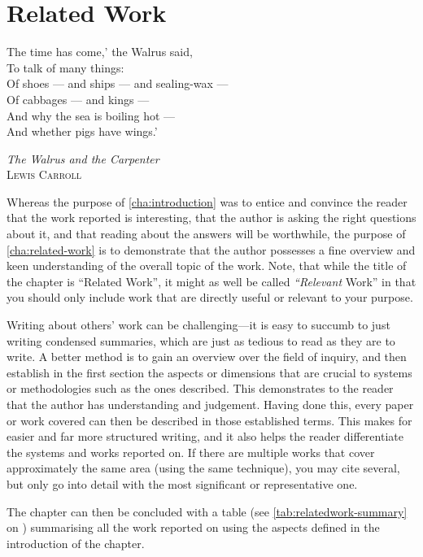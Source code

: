 \chapter{Related Work}
\label{cha:related-work}

\epigraph{%
  The time has come,' the Walrus said,\\
      To talk of many things:\\
Of shoes — and ships — and sealing-wax —\\
      Of cabbages — and kings —\\
And why the sea is boiling hot —\\
      And whether pigs have wings.'}%
  {\textit{The Walrus and the Carpenter}\\ \textsc{Lewis Carroll}}
Whereas the purpose of \autoref{cha:introduction} was to entice and
convince the reader that the work reported is interesting, that the author
is asking the right questions about it, and that reading about the answers will be
worthwhile, the purpose of \autoref{cha:related-work} is to
demonstrate that the author possesses a fine overview and keen
understanding of the overall topic of the work.  Note, that while the title of
the chapter is ``Related Work'', it might as well be called
\emph{``Relevant} Work'' in that you should only include work that are
directly useful or relevant to your purpose. 

Writing about others' work can be challenging---it is easy to succumb to just
writing condensed summaries, which are just as tedious to read as they are to
write.  A better method is to gain an overview over the field of inquiry, and
then establish in the first section the aspects or dimensions that are crucial
to systems or methodologies such as the ones described. This demonstrates to
the reader that the author has understanding and judgement. Having done this,
every paper or work covered can then be described in those established terms. This
makes for easier and far more structured writing, and it also helps the
reader differentiate the systems and works reported on. If there are multiple
works that cover approximately the same area (\eg using the same technique),
you may cite several, but only go into detail with the most significant or
representative one.

The chapter can then be concluded with a table (see
\autoref{tab:relatedwork-summary} on )
summarising all the work reported on using the aspects defined in the
introduction of the chapter.

